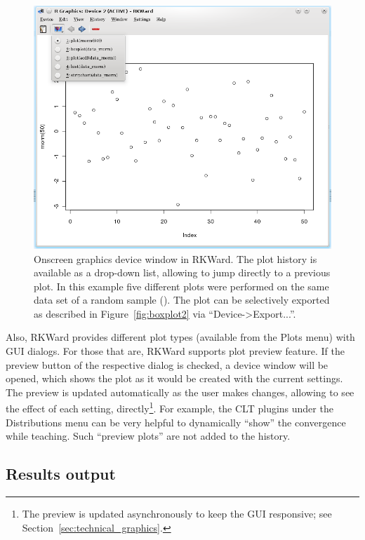 \begin{figure}[htp]
 \centering
 \includegraphics{../figures/plot_history_cropped.png}
 \caption{Onscreen graphics device window in RKWard. The plot history is 
  available as a drop-down list, allowing to jump directly to a previous 
  plot. In this example five different plots were performed on the same data 
  set of a random sample (). The plot can be 
  selectively exported as described in Figure~\ref{fig:boxplot2} via ``Device->Export...''.
}
 \label{fig:plot_history}
\end{figure}

Also, RKWard provides different plot types (available from the Plots
menu) with GUI dialogs. For those that are, RKWard supports plot
preview feature. If the preview button of
the respective dialog is checked, a device window will be opened, which
shows the plot as it would be created with the current settings. The
preview is updated automatically as the user makes changes, allowing to
see the effect of each setting, directly\footnote{The preview is
updated asynchronously to keep the GUI responsive; see Section~\ref{sec:technical_graphics}.}. For example, the CLT plugins
under the Distributions menu can be very helpful to dynamically ``show''
the convergence while teaching. Such ``preview plots'' are not added to
the history.

\subsection{Results output}
\label{sec:results_output}

